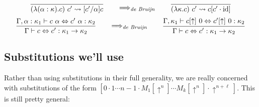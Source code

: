 \begin{judgment}
\[
  \vcenter{
    \infer{(\lambda (\alpha : \kappa). c)~c' \leadsto [c'/\alpha] c}{}
  }
  \qquad
  \Longrightarrow_\emph{de Bruijn}
  \qquad
  \vcenter{
    \infer{(\lambda \kappa.c)~c' \leadsto c[ c' \cdot \id]}{}
  }
\]
\[
  \vcenter{
    \infer
      {\Gamma \vdash c \Leftrightarrow c' : \kappa_1 \rightarrow \kappa_2}
      {\Gamma, \alpha : \kappa_1 \vdash c~\alpha \Leftrightarrow c'~\alpha : \kappa_2}
  }
  \qquad
  \Longrightarrow_\emph{de Bruijn}
  \qquad
  \vcenter{
    \infer
      {\Gamma \vdash c \Leftrightarrow c' : \kappa_1 \rightarrow \kappa_2}
      {\Gamma, \kappa_1 \vdash c[\uparrow]~0 \Leftrightarrow c'[\uparrow]~0 : \kappa_2}
  }
\]
\end{judgment}

\subsection{Substitutions we'll use}
Rather than using substitutions in their full generality, we are really concerned with substitutions
of the form $[ 0 \cdot 1 \cdots n-1 \cdot M_1[\uparrow^n] \cdots M_k[\uparrow^n] \cdot \uparrow^{n+\ell}]$.
This is still pretty general:
